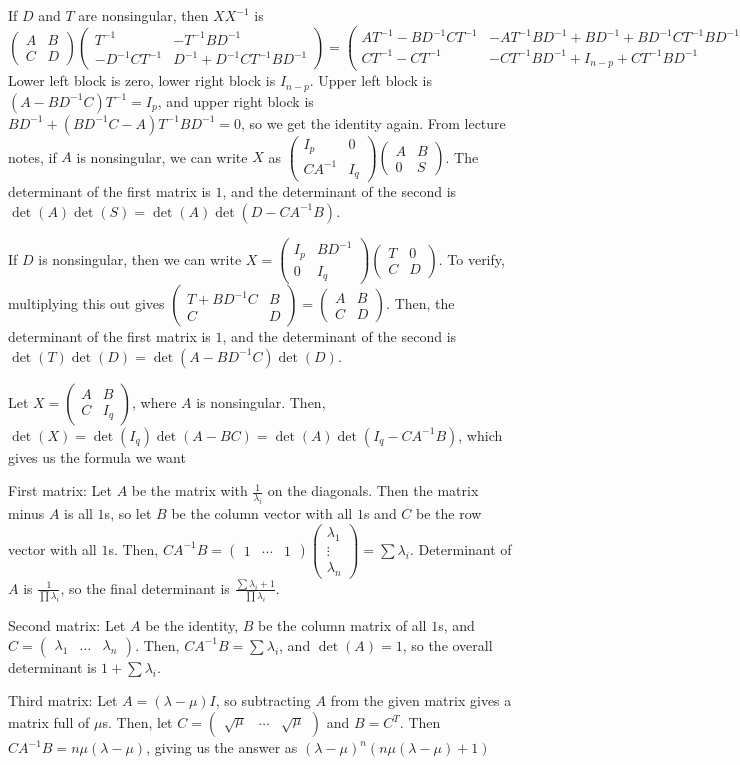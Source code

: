 \documentclass{article}
\newcommand{\openm}{\begin{pmatrix}}
\newcommand{\closem}{\end{pmatrix}}
\begin{document}
If $D$ and $T$ are nonsingular, then $XX^{-1}$ is
\[\openm A&B\\C&D\closem\openm T^{-1}&-T^{-1}BD^{-1}\\-D^{-1}CT^{-1}&D^{-1}+D^{-1}CT^{-1}BD^{-1}\closem
=\openm AT^{-1}-BD^{-1}CT^{-1}&-AT^{-1}BD^{-1}+BD^{-1}+BD^{-1}CT^{-1}BD^{-1}\\CT^{-1}-CT^{-1}&-CT^{-1}BD^{-1}+I_{n-p}+CT^{-1}BD^{-1}\closem\]
Lower left block is zero, lower right block is $I_{n-p}$. Upper left block is $(A-BD^{-1}C)T^{-1}=I_p$, and upper right block is $BD^{-1}+(BD^{-1}C-A)T^{-1}BD^{-1}=0$, so we get the identity again.
From lecture notes, if $A$ is nonsingular, we can write $X$ as $\openm I_p&0\\CA^{-1}&I_q\closem\openm A&B\\0&S\closem$. The determinant of the first matrix is $1$, and the determinant of the second is $\det(A)\det(S)=\det(A)\det(D-CA^{-1}B)$.

If $D$ is nonsingular, then we can write $X=\openm I_p&BD^{-1}\\0&I_q\closem\openm T&0\\C&D\closem$. To verify, multiplying this out gives $\openm T+BD^{-1}C&B\\C&D\closem=\openm A&B\\C&D\closem$. Then, the determinant of the first matrix is $1$, and the determinant of the second is $\det(T)\det(D)=\det(A-BD^{-1}C)\det(D)$.

Let $X=\openm A&B\\C&I_q\closem$, where $A$ is nonsingular. Then, $\det(X)=\det(I_q)\det(A-BC)=\det(A)\det(I_q-CA^{-1}B)$, which gives us the formula we want

First matrix: Let $A$ be the matrix with $\frac{1}{\lambda_i}$ on the diagonals. Then the matrix minus $A$ is all $1$s, so let $B$ be the column vector with all $1$s and $C$ be the row vector with all $1$s. Then, $CA^{-1}B=\openm1&\cdots&1\closem\openm\lambda_1\\\vdots\\\lambda_n\closem=\sum\lambda_i$. Determinant of $A$ is $\frac{1}{\prod\lambda_i}$, so the final determinant is $\frac{\sum\lambda_i+1}{\prod\lambda_i}$.

Second matrix: Let $A$ be the identity, $B$ be the column matrix of all $1$s, and $C=\openm\lambda_1&\hdots&\lambda_n\closem$. Then, $CA^{-1}B=\sum\lambda_i$, and $\det(A)=1$, so the overall determinant is $1+\sum\lambda_i$.

Third matrix: Let $A=(\lambda-\mu)I$, so subtracting $A$ from the given matrix gives a matrix full of $\mu$s. Then, let $C=\openm\sqrt{\mu}&\hdots&\sqrt{\mu}\closem$ and $B=C^T$. Then $CA^{-1}B=n\mu(\lambda-\mu)$, giving us the answer as $(\lambda-\mu)^n(n\mu(\lambda-\mu)+1)$
\end{document}
